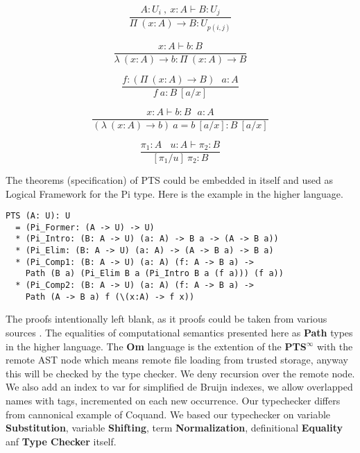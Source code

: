\begin{definition}
\begin{definition}
\begin{definition}
\begin{definition}
\begin{equation}
\tag{$\Pi$-formation}
\dfrac
{A:U_i\ ,\ x:A \vdash B : U_j}
{\Pi\ (x:A) \rightarrow B : U_{p(i,j)}}
\end{equation}

\begin{equation}
\tag{$\lambda$-intro}
\dfrac
{x:A \vdash b : B}
{\lambda\ (x:A) \rightarrow b : \Pi\ (x: A) \rightarrow B }
\end{equation}

\begin{equation}
\tag{$App$-elimination}
\dfrac
{f: (\Pi\ (x:A) \rightarrow B)\ \ \ a: A}
{f\ a : B\ [a/x]}
\end{equation}

\begin{equation}
\tag{$\beta$-computation}
\dfrac
{x:A \vdash b: B\ \ \ a:A}
{(\lambda\ (x:A) \rightarrow b)\ a = b\ [a/x] : B\ [a/x]}
\end{equation}

\begin{equation}
\tag{subst}
\dfrac
{\pi_1 : A\ \ \ \ u:A \vdash \pi_2 : B}
{[\pi_1/u]\ \pi_2 : B}
\end{equation}

The theorems (specification) of PTS could be embedded in itself and used as
Logical Framework for the Pi type. Here is the example in the higher language.

\begin{lstlisting}[mathescape=true]
PTS (A: U): U
  = (Pi_Former: (A -> U) -> U)
  * (Pi_Intro: (B: A -> U) (a: A) -> B a -> (A -> B a))
  * (Pi_Elim: (B: A -> U) (a: A) -> (A -> B a) -> B a)
  * (Pi_Comp1: (B: A -> U) (a: A) (f: A -> B a) ->
    Path (B a) (Pi_Elim B a (Pi_Intro B a (f a))) (f a))
  * (Pi_Comp2: (B: A -> U) (a: A) (f: A -> B a) ->
    Path (A -> B a) f (\(x:A) -> f x))
\end{lstlisting}

The proofs intentionally left blank, as it proofs could be taken from various sources \cite{Henk93}.
The equalities of computational semantics presented here as {\bf Path} types in the higher language.
The {\bf Om} language is the extention of the {\bf PTS$^\infty$} with the remote AST node which means remote file loading from trusted storage, anyway this will be checked by the type checker.
We deny recursion over the remote node.
We also add an index to var for simplified de Bruijn indexes, we allow overlapped names with tags, incremented on each new occurrence.
Our typechecker differs from cannonical example of Coquand\cite{Coq96}. 
We based our typechecker on variable {\bf Substitution}, variable {\bf Shifting}, term {\bf Normalization}, definitional {\bf Equality} anf {\bf Type Checker} itself.



\end{definition}
\end{definition}
\end{definition}
\end{definition}
